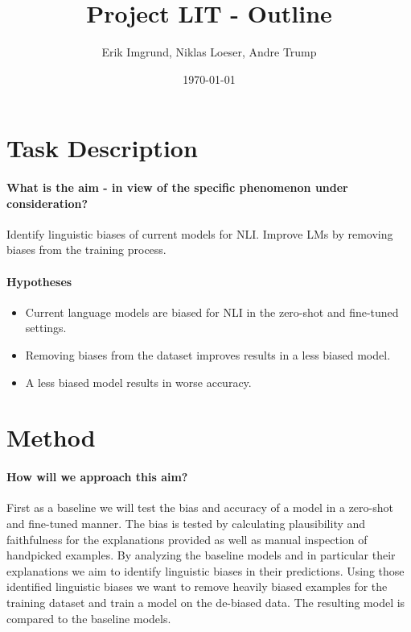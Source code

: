\documentclass[12pt,a4paper]{article}
\title{Project LIT - Outline}
\author{Erik Imgrund, Niklas Loeser, Andre Trump}
\date{\today}
\begin{document}
\begin{acronym}
\end{acronym}

\maketitle

\section{Task Description}
\paragraph{What is the aim - in view of the specific phenomenon under consideration?}
Identify linguistic biases of current models for \ac{NLI}. Improve \acp{LM} by removing biases from the training process.

\paragraph{Hypotheses}
\begin{itemize}
    \item Current language models are biased for \ac{NLI} in the zero-shot and fine-tuned settings.
    \item Removing biases from the dataset improves results in a less biased model.
    \item A less biased model results in worse accuracy.
\end{itemize}

\section{Method}
\paragraph{How will we approach this aim?} First as a baseline we will test the bias and accuracy of a model in a zero-shot and fine-tuned manner. The bias is tested by calculating plausibility and faithfulness \parencite{attanasio2022ferret} for the explanations provided as well as manual inspection of handpicked examples. By analyzing the baseline models and in particular their explanations we aim to identify linguistic biases in their predictions. Using those identified linguistic biases we want to remove heavily biased examples for the training dataset and train a model on the de-biased data. The resulting model is compared to the baseline models.
\end{document}
